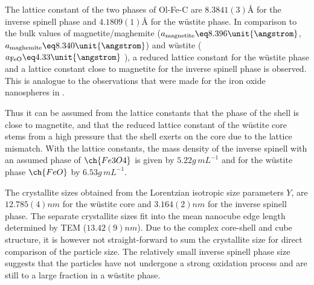 \documentclass[\main/dresen_thesis.tex]{subfiles}
\begin{document}
    The lattice constant of the two phases of Ol-Fe-C are $8.3841(3) \unit{\angstrom}$ for the inverse spinell phase and $4.1809(1) \unit{\angstrom}$ for the w\"ustite phase.
    In comparison to the bulk values of magnetite/maghemite ($a_\mathrm{magnetite} \eq 8.396 \unit{\angstrom}$, $a_\mathrm{maghemite} \eq 8.340 \unit{\angstrom}$) \cite{Cornell_2003_Their} and w\"ustite ($a_\mathrm{FeO} \eq 4.33 \unit{\angstrom}$ \cite{Hentschel_1970_Stoich}), a reduced lattice constant for the w\"ustite phase and a lattice constant close to magnetite for the inverse spinell phase is observed.
    This is analogue to the observations that were made for the iron oxide nanospheres in .

    Thus it can be assumed from the lattice constants that the phase of the shell is close to magnetite, and that the reduced lattice constant of the w\"ustite core stems from a high pressure that the shell exerts on the core due to the lattice mismatch.
    With the lattice constants, the mass density of the inverse spinell with an assumed phase of $\ch{Fe3O4}$ is given by $5.22 \unit{g \, mL^{-1}}$ and for the w\"ustite phase $\ch{FeO}$ by $6.53 \unit{g \, mL^{-1}}$.

    The crystallite sizes obtained from the Lorentzian isotropic size parameters $Y$, are $12.785(4) \unit{nm}$ for the w\"ustite core and $3.164(2) \unit{nm}$ for the inverse spinell phase.
    The separate crystallite sizes fit into the mean nanocube edge length determined by TEM ($13.42(9) \unit{nm}$). 
    Due to the complex core-shell and cube structure, it is however not straight-forward to sum the crystallite size for direct comparison of the particle size.
    The relatively small inverse spinell phase size suggests that the particles have not undergone a strong oxidation process and are still to a large fraction in a w\"ustite phase.
\end{document}
